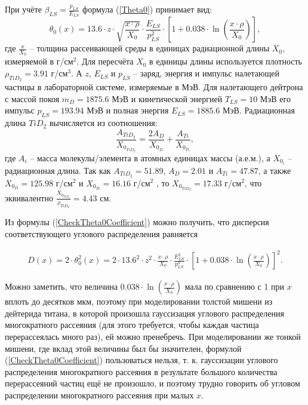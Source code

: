 \documentclass[a4paper,12pt]{article}
\begin{document}
\begin{large}
	При учёте $\beta_{LS}=\frac{p_{LS}}{E_{LS}}$ формула (\ref{Theta0}) принимает вид:
\begin{equation}
  \label{CheckTheta0Coefficient}
  \theta_0(x)=13.6 \cdot z \cdot \sqrt{\frac{x\cdot \rho}{X_0}} \cdot \frac{E_{LS}}{p^2_{LS}} \cdot\left[ 1+0.038\cdot\ln\left(\frac{x\cdot \rho}{X_0}\right)\right],
\end{equation}
	где $\frac{x}{X_0}$ -- толщина рассеивающей среды в единицах радиационной длины $X_0$, измеряемой в г/см$^2$.
	Для пересчёта $X_0$ в единицы длины используется плотность $\rho_{TiD_2}=3.91$ г/см$^3$.
	А $z$, $E_{LS}$ и $p_{LS}$ -- заряд, энергия и импульс налетающей частицы в лабораторной системе, измеряемые в МэВ.
	Для налетающего дейтрона с массой покоя $m_D=1875.6$ МэВ и кинетической энергией $T_{LS}=10$ МэВ его импульс $p_{LS}=193.94$ МэВ и полная энергия $E_{LS}=1885.6$ МэВ.
	Радиационная длина $TiD_2$ вычисляется из соотношения:
\begin{equation}
  \label{RadLength}
  \frac{A_{TiD_2}}{X_{0_{TiD_2}}}=\frac{2 A_{D}}{X_{0_{D}}}+\frac{A_{Ti}}{X_{0_{Ti}}},
\end{equation}
	где $A_i$ -- масса молекулы/элемента в атомных единицах массы (а.е.м.), а $X_{0_i}$ -- радиационная длина.
  	Так как $A_{TiD_2}=51.89$, $A_{D}=2.01$ и $A_{Ti}=47.87$, а также $X_{0_{D}}=125.98$ г/см$^2$ и $X_{0_{Ti}}=16.16$ г/см$^2$ \cite{PDG}, то $X_{0_{TiD_2}}=17.33$ г/см$^2$, что эквивалентно $\frac{X_{0_{TiD_2}}}{\rho_{TiD_2}}=4.43$ см.
  
  	Из формулы (\ref{CheckTheta0Coefficient}) можно получить, что дисперсия соответствующего углового распределения равняется

\begin{equation}
  \label{Theta0Dispersion}
  \begin{aligned}
   D(x)=2 \cdot \theta^2_0(x)=2 \cdot 13.6^2 \cdot z^2 \cdot \frac{x\cdot \rho}{X_0} \cdot \frac{E^2_{LS}}{p^4_{LS}} \cdot\left[ 1+0.038\cdot\ln\left(\frac{x\cdot \rho}{X_0}\right)\right]^2.
   \end{aligned}
\end{equation}

  
  	Можно заметить, что величина $0.038\cdot\ln\left(\frac{x\cdot \rho}{X_0}\right)$ мала по сравнению с 1 при $x$ вплоть до десятков мкм, поэтому при моделировании толстой мишени из дейтерида титана, в которой произошла гауссизация углового распределения многократного рассеяния (для этого требуется, чтобы каждая частица перерассеялась много раз), ей можно пренебречь.
  	При моделировании же тонкой мишени, где вклад этой величины был бы значителен, формулой  (\ref{CheckTheta0Coefficient}) пользоваться нельзя, т. к. гауссизации углового распределения многократного рассеяния в результате большого количества перерассеяний частиц ещё не произошло, и поэтому трудно говорить об угловом распределении многократного рассеяния при малых $x$.
  

\end{large}
\end{document}
